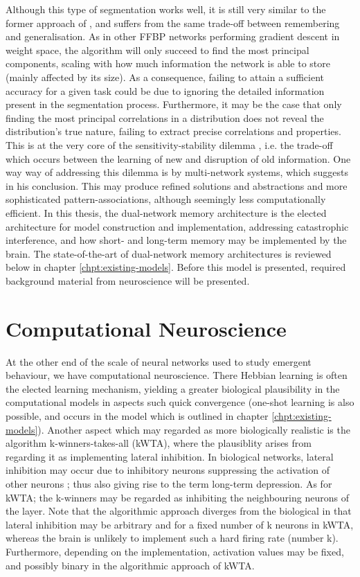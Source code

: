 Although this type of segmentation works well, it is still very similar to the former approach of \cite{French1992}, and suffers from the same trade-off between remembering and generalisation. As in other FFBP networks performing gradient descent in weight space, the algorithm will only succeed to find the most principal components, scaling with how much information the network is able to store (mainly affected by its size). As a consequence, failing to attain a sufficient accuracy for a given task could be due to ignoring the detailed information present in the segmentation process. Furthermore, it may be the case that only finding the most principal correlations in a distribution does not reveal the distribution's true nature, failing to extract precise correlations and properties. This is at the very core of the sensitivity-stability dilemma \citep{Hebb1949}, i.e. the trade-off which occurs between the learning of new and disruption of old information. One way way of addressing this dilemma is by multi-network systems, which \cite{French1994} suggests in his conclusion. This may produce refined solutions and abstractions and more sophisticated pattern-associations, although seemingly less computationally efficient. In this thesis, the dual-network memory architecture \citep{McClelland1995} is the elected architecture for model construction and implementation, addressing catastrophic interference, and how short- and long-term memory may be implemented by the brain. The state-of-the-art of dual-network memory architectures is reviewed below in chapter \ref{chpt:existing-models}. Before this model is presented, required background material from neuroscience will be presented.


\section{Computational Neuroscience}

At the other end of the scale of neural networks used to study emergent behaviour, we have computational neuroscience. There Hebbian learning is often the elected learning mechanism, yielding a greater biological plausibility in the computational models in aspects such quick convergence (one-shot learning is also possible, and occurs in the model which is outlined in chapter \ref{chpt:existing-models}). Another aspect which may regarded as more biologically realistic is the algorithm k-winners-takes-all (kWTA), where the plausiblity arises from regarding it as implementing lateral inhibition. In biological networks, lateral inhibition may occur due to inhibitory neurons suppressing the activation of other neurons \citep{Rolls1998chpt1}; thus also giving rise to the term long-term depression. As for kWTA; the k-winners may be regarded as inhibiting the neighbouring neurons of the layer. Note that the algorithmic approach diverges from the biological in that lateral inhibition may be arbitrary and for a fixed number of k neurons in kWTA, whereas the brain is unlikely to implement such a hard firing rate (number k). Furthermore, depending on the implementation, activation values may be fixed, and possibly binary in the algorithmic approach of kWTA.

